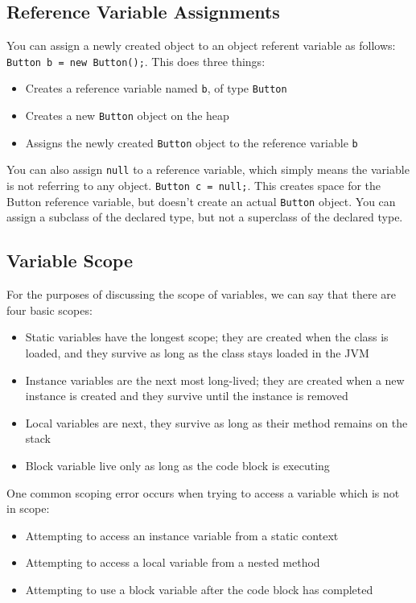 \subsection{Reference Variable Assignments}
You can assign a newly created object to an object referent variable as 
follows: \verb#Button b = new Button();#. This does three things:
\begin{itemize}
    \item Creates a reference variable named \verb#b#, of type \verb#Button#
    \item Creates a new \verb#Button# object on the heap
    \item Assigns the newly created \verb#Button# object to the reference 
    variable \verb#b#
\end{itemize}
You can also assign \verb#null# to a reference variable, which simply means the 
variable is not referring to any object. \verb#Button c = null;#. This creates 
space for the Button reference variable, but doesn't create an actual 
\verb#Button# object. You can assign a subclass of the declared type, but not a 
superclass of the declared type.

\subsection{Variable Scope}
For the purposes of discussing the scope of variables, we can say that there 
are four basic scopes:
\begin{itemize}
    \item Static variables have the longest scope; they are created when the 
    class is loaded, and they survive as long as the class stays loaded in the 
    JVM
    \item Instance variables are the next most long-lived; they are created 
    when a new instance is created and they survive until the instance is 
    removed
    \item Local variables are next, they survive as long as their method 
    remains on the stack
    \item Block variable live only as long as the code block is executing
\end{itemize}
One common scoping error occurs when trying to access a variable which is not 
in scope:
\begin{itemize}
    \item Attempting to access an instance variable from a static context
    \item Attempting to access a local variable from a nested method
    \item Attempting to use a block variable after the code block has completed
\end{itemize}

